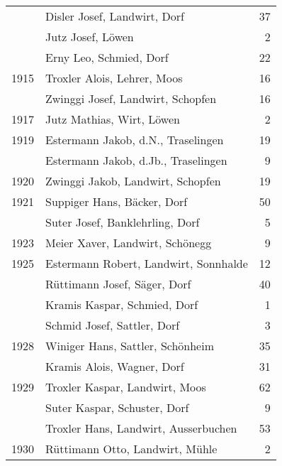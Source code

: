 {\begin{longtable}{ l l r }
                      & Disler Josef, Landwirt, Dorf              & 37          \\
                      & Jutz Josef, Löwen                         & 2           \\
                      & Erny Leo, Schmied, Dorf                   & 22          \\
        1915          & Troxler Alois, Lehrer, Moos               & 16          \\
                      & Zwinggi Josef, Landwirt, Schopfen         & 16          \\
        1917          & Jutz Mathias, Wirt, Löwen                 & 2           \\
        1919          & Estermann Jakob, d.N., Traselingen        & 19          \\
                      & Estermann Jakob, d.Jb., Traselingen       & 9           \\
        1920          & Zwinggi Jakob, Landwirt, Schopfen         & 19          \\
        1921          & Suppiger Hans, Bäcker, Dorf               & 50          \\
                      & Suter Josef, Banklehrling, Dorf           & 5           \\
        1923          & Meier Xaver, Landwirt, Schönegg           & 9           \\
        1925          & Estermann Robert, Landwirt, Sonnhalde     & 12          \\
                      & Rüttimann Josef, Säger, Dorf              & 40          \\
                      & Kramis Kaspar, Schmied, Dorf              & 1           \\
                      & Schmid Josef, Sattler, Dorf               & 3           \\
        1928          & Winiger Hans, Sattler, Schönheim          & 35          \\
                      & Kramis Alois, Wagner, Dorf                & 31          \\
        1929          & Troxler Kaspar, Landwirt, Moos            & 62          \\
                      & Suter Kaspar, Schuster, Dorf              & 9           \\
                      & Troxler Hans, Landwirt, Ausserbuchen      & 53          \\
        1930          & Rüttimann Otto, Landwirt, Mühle           & 2           \\

\end{longtable}}
